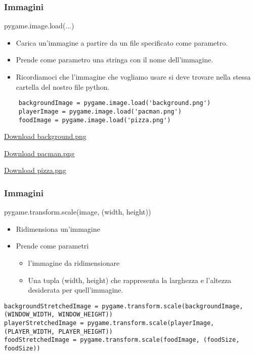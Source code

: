 \documentclass{beamer}
\begin{document}
\begin{frame}[fragile]
\frametitle{Immagini}
    \begin{block}{pygame.image.load(...)}
        \begin{itemize}
            \item Carica un'immagine a partire da un file specificato come parametro.
            \item Prende come parametro una stringa con il nome dell'immagine.
            \item Ricordiamoci che l'immagine che vogliamo usare si deve trovare nella stessa cartella del nostro file python.
        \end{itemize}
    \end{block}
    
    \begin{lstlisting}
    backgroundImage = pygame.image.load('background.png')
    playerImage = pygame.image.load('pacman.png')
    foodImage = pygame.image.load('pizza.png')
    \end{lstlisting}
    \href{https://github.com/ragazzedigitalicesena/slide-2019/raw/master/tex/chapter_19-20/images/background.png}{Download background.png}

    \href{https://github.com/ragazzedigitalicesena/slide-2019/raw/master/tex/chapter_19-20/images/pacman.png}{Download pacman.png}
        
    \href{https://github.com/ragazzedigitalicesena/slide-2019/raw/master/tex/chapter_19-20/images/pizza.png}{Download pizza.png}    
\end{frame}

\begin{frame}[fragile]
\frametitle{Immagini}
    \begin{block}{pygame.transform.scale(image, (width, height))}
        \begin{itemize}
            \item Ridimensiona un'immagine
            \item Prende come parametri
                \begin{itemize}
                    \item l'immagine da ridimensionare
                    \item Una tupla (width, height) che rappresenta la larghezza e l'altezza desiderata per quell'immagine.
                \end{itemize}{}
        \end{itemize}
    \end{block}
    
    \begin{lstlisting}
backgroundStretchedImage = pygame.transform.scale(backgroundImage, (WINDOW_WIDTH, WINDOW_HEIGHT))
playerStretchedImage = pygame.transform.scale(playerImage, (PLAYER_WIDTH, PLAYER_HEIGHT))
foodStretchedImage = pygame.transform.scale(foodImage, (foodSize, foodSize))
    \end{lstlisting}
\end{frame}
\end{document}
